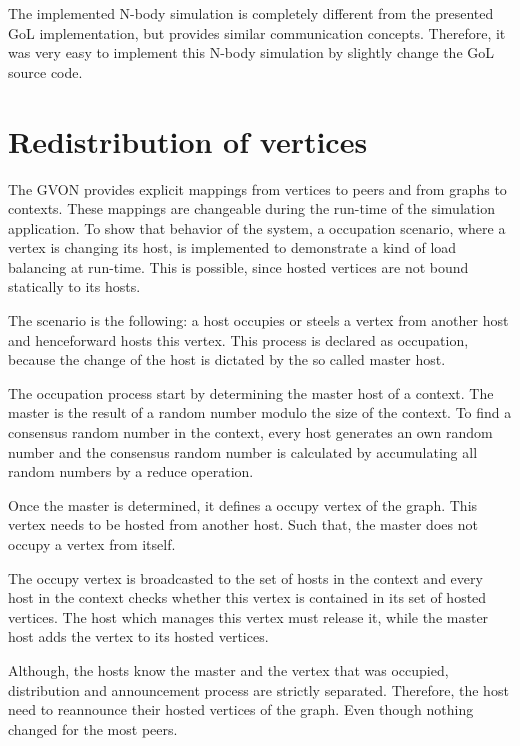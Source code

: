 The implemented N-body simulation is completely different from the
presented GoL implementation, but provides similar communication
concepts. Therefore, it was very easy to implement this N-body
simulation by slightly change the GoL source code.


\section{Redistribution of vertices}

The GVON provides explicit mappings from vertices to peers and from
graphs to contexts. These mappings are changeable during the run-time
of the simulation application.  To show that behavior of the system, a
occupation scenario, where a vertex is changing its host, is
implemented to demonstrate a kind of load balancing at run-time. This
is possible, since hosted vertices are not bound statically to its
hosts.

The scenario is the following: a host occupies or steels a vertex
from another host and henceforward hosts this vertex.  This process
is declared as occupation, because the change of the host is
dictated by the so called master host.

The occupation process start by determining the master host of a
context. The master is the result of a random number modulo the size
of the context. To find a consensus random number in the context,
every host generates an own random number and the consensus random
number is calculated by accumulating all random numbers by a
reduce operation.

Once the master is determined, it defines a occupy vertex of the
graph. This vertex needs to be hosted from another host. Such that,
the master does not occupy a vertex from itself.

The occupy vertex is broadcasted to the set of hosts in the context
and every host in the context checks whether this vertex is contained
in its set of hosted vertices. The host which manages this vertex must
release it, while the master host adds the vertex to its hosted
vertices.

Although, the hosts know the master and the vertex that was occupied,
distribution and announcement process are strictly
separated. Therefore, the host need to reannounce their hosted
vertices of the graph. Even though nothing changed for the most peers.

